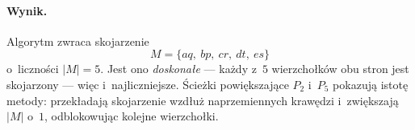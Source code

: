 \paragraph{Wynik.}
Algorytm zwraca skojarzenie
\[
	\boxed{M = \{aq,\ bp,\ cr,\ dt,\ es\}}
\]
o~liczności $|M| = 5$. Jest ono \emph{doskonałe} --- każdy z~$5$ wierzchołków obu
stron jest skojarzony --- więc i~najliczniejsze. Ścieżki powiększające $P_2$
i~$P_5$ pokazują istotę metody: przekładają skojarzenie wzdłuż naprzemiennych
krawędzi i~zwiększają $|M|$ o~$1$, odblokowując kolejne wierzchołki.
